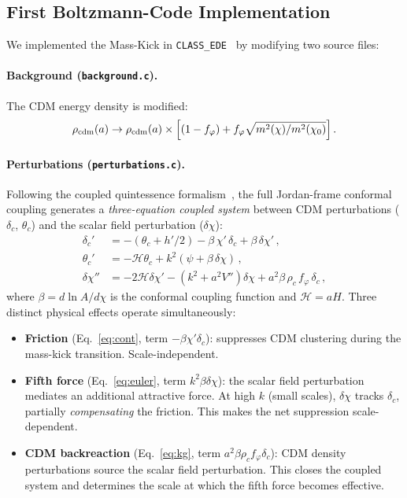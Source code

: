 \documentclass[a4paper,11pt]{article}
\newcommand{\chif}{\chi}
\newcommand{\fphi}{f_\varphi}
\begin{document}
\subsection{First Boltzmann-Code Implementation}
\label{sec:boltzmann}

We implemented the Mass-Kick in \texttt{CLASS\_EDE}~\cite{ClassEDE} by modifying two source files:

\paragraph{Background (\texttt{background.c}).} The CDM energy density is modified:
\begin{equation}
\rho_{\rm cdm}(a) \to \rho_{\rm cdm}(a)\times\Big[(1-\fphi) + \fphi\sqrt{m^2(\chif)/m^2(\chif_0)}\Big]\,.
\end{equation}

\paragraph{Perturbations (\texttt{perturbations.c}).} Following the coupled quintessence formalism~\cite{Amendola2000}, the full Jordan-frame conformal coupling generates a \textit{three-equation coupled system} between CDM perturbations ($\delta_c$, $\theta_c$) and the scalar field perturbation ($\delta\chif$):
\begin{align}
\delta_c' &= -(\theta_c + h'/2) - \beta\,\chif'\,\delta_c + \beta\,\delta\chif'\,, \label{eq:cont}\\
\theta_c' &= -\mathcal{H}\theta_c + k^2(\psi + \beta\,\delta\chif)\,, \label{eq:euler}\\
\delta\chif'' &= -2\mathcal{H}\delta\chif' - (k^2 + a^2 V'')\delta\chif + a^2\beta\,\rho_c\,\fphi\,\delta_c\,, \label{eq:kg}
\end{align}
where $\beta = d\ln A/d\chif$ is the conformal coupling function and $\mathcal{H} = aH$. Three distinct physical effects operate simultaneously:
\begin{itemize}[nosep]
\item \textbf{Friction} (Eq.~\ref{eq:cont}, term $-\beta\chif'\delta_c$): suppresses CDM clustering during the mass-kick transition. Scale-independent.
\item \textbf{Fifth force} (Eq.~\ref{eq:euler}, term $k^2\beta\delta\chif$): the scalar field perturbation mediates an additional attractive force. At high $k$ (small scales), $\delta\chif$ tracks $\delta_c$, partially \textit{compensating} the friction. This makes the net suppression scale-dependent.
\item \textbf{CDM backreaction} (Eq.~\ref{eq:kg}, term $a^2\beta\rho_c\fphi\delta_c$): CDM density perturbations source the scalar field perturbation. This closes the coupled system and determines the scale at which the fifth force becomes effective.
\end{itemize}
\end{document}
